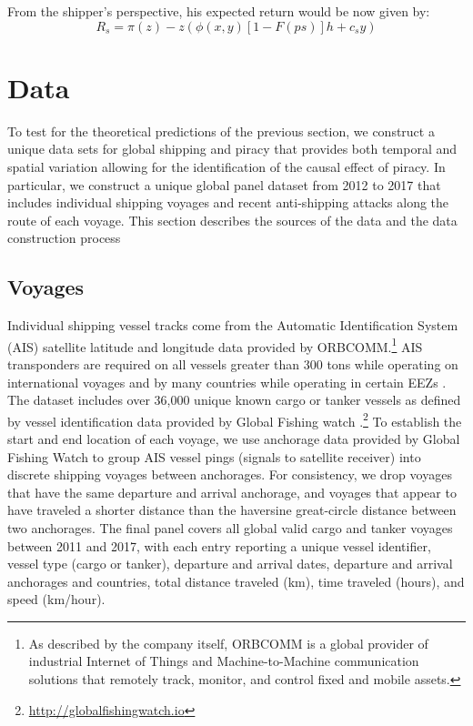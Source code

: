 \documentclass[11pt, oneside]{article}   	%
\begin{document}
From the shipper's perspective, his expected return would be now given by:
\begin{equation}
R_s=\pi(z)-z\left(\phi(x,y)[1-F(ps)]h+c_sy\right)
\end{equation}
 

 

 
 

\section{Data}

To test for the theoretical predictions of the previous section, we construct a unique data sets for global shipping and piracy that provides both temporal and spatial variation allowing for the identification of the causal effect of piracy. In particular, we construct a unique global panel dataset from 2012 to 2017 that includes individual shipping voyages and recent anti-shipping attacks along the route of each voyage. This section describes the sources of the data and the data construction process

\subsection{Voyages}

Individual shipping vessel tracks come from the Automatic Identification System (AIS) satellite latitude and longitude data provided by ORBCOMM.\footnote{As described by the company itself, ORBCOMM is a global provider of industrial Internet of Things and Machine-to-Machine communication solutions that remotely track, monitor, and control fixed and mobile assets.} AIS transponders are required on all vessels greater than 300 tons while operating on international voyages and by many countries while operating in certain EEZs \parencite{mccauley2016ending}. The dataset includes over 36,000 unique known cargo or tanker vessels as defined by vessel identification data provided by Global Fishing watch \parencite{kroodsma2018tracking}.\footnote{\url{http://globalfishingwatch.io}} To establish the start and end location of each voyage, we use anchorage data provided by Global Fishing Watch to group AIS vessel pings (signals to satellite receiver) into discrete shipping voyages between anchorages. For consistency, we drop voyages that have the same departure and arrival anchorage,  and voyages that appear to have traveled a shorter distance than the haversine great-circle distance between two anchorages. The final panel covers all global valid cargo and tanker voyages between 2011 and 2017, with each entry reporting a unique vessel identifier, vessel type (cargo or tanker), departure and arrival dates, departure and arrival anchorages and countries, total distance traveled (km), time traveled (hours), and speed (km/hour). 
\end{document}

